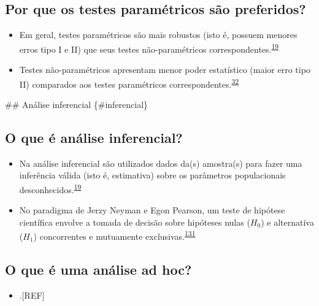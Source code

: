 \documentclass[
]{book}
\providecommand{\tightlist}{%
  \setlength{\itemsep}{0pt}\setlength{\parskip}{0pt}}
\begin{document}
\hypertarget{por-que-os-testes-paramuxe9tricos-suxe3o-preferidos}{%
\subsection{Por que os testes paramétricos são preferidos?}\label{por-que-os-testes-paramuxe9tricos-suxe3o-preferidos}}

\begin{itemize}
\item
  Em geral, testes paramétricos são mais robustos (isto é, possuem menores erros tipo I e II) que seus testes não-paramétricos correspondentes.\textsuperscript{\protect\hyperlink{ref-vetter2017}{19}}
\item
  Testes não-paramétricos apresentam menor poder estatístico (maior erro tipo II) comparados aos testes paramétricos correspondentes.\textsuperscript{\protect\hyperlink{ref-Ali2016}{32}}
\end{itemize}

\#\# Análise inferencial \{\#inferencial\}

\hypertarget{o-que-uxe9-anuxe1lise-inferencial}{%
\subsection{O que é análise inferencial?}\label{o-que-uxe9-anuxe1lise-inferencial}}

\begin{itemize}
\item
  Na análise inferencial são utilizados dados da(s) amostra(s) para fazer uma inferência válida (isto é, estimativa) sobre os parâmetros populacionais desconhecidos.\textsuperscript{\protect\hyperlink{ref-vetter2017}{19}}
\item
  No paradigma de Jerzy Neyman e Egon Pearson, um teste de hipótese científica envolve a tomada de decisão sobre hipóteses nulas (\(H_{0}\)) e alternativa (\(H_{1}\)) concorrentes e mutuamente exclusivas.\textsuperscript{\protect\hyperlink{ref-Curran-Everett2009}{131}}
\end{itemize}

\hypertarget{o-que-uxe9-uma-anuxe1lise-ad-hoc}{%
\subsection{O que é uma análise ad hoc?}\label{o-que-uxe9-uma-anuxe1lise-ad-hoc}}

\begin{itemize}
\tightlist
\item
  .{[}REF{]}
\end{itemize}
\end{document}
